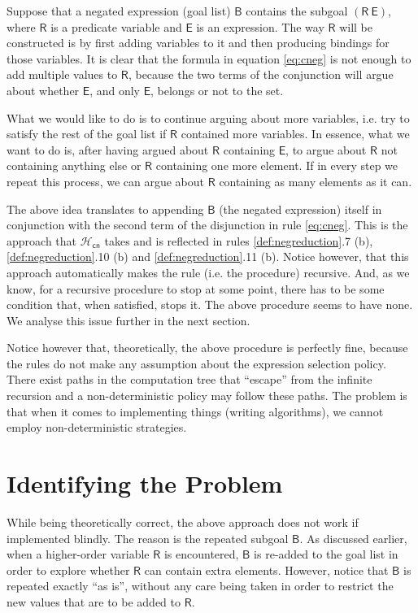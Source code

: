 \documentclass[inscr,ack,preface]{dithesis}
\theoremstyle{definition}
\newcommand{\hcn}{$\mathcal{H}_\mathsf{cn}$}
\newcommand{\msf}[1]{$\mathsf{#1}$}
\begin{document}
Suppose that a negated expression (goal list) \msf{B} contains the subgoal \msf{(R ~ E)}, where \msf{R} is a predicate variable and \msf{E} is an expression. The way \msf{R} will be constructed is by first adding variables to it and then producing bindings for those variables. It is clear that the formula in equation \ref{eq:cneg} is not enough to add multiple values to \msf{R}, because the two terms of the conjunction will argue about whether \msf{E}, and only \msf{E}, belongs or not to the set.

What we would like to do is to continue arguing about more variables, i.e. try to satisfy the rest of the goal list if \msf{R} contained more variables. In essence, what we want to do is, after having argued about \msf{R} containing \msf{E}, to argue about \msf{R} not containing anything else or \msf{R} containing one more element. If in every step we repeat this process, we can argue about \msf{R} containing as many elements as it can.

The above idea translates to appending \msf{B} (the negated expression) itself in conjunction with the second term of the disjunction in rule \ref{eq:cneg}. This is the approach that \hcn{} takes and is reflected in rules \ref{def:negreduction}.7 (b), \ref{def:negreduction}.10 (b) and \ref{def:negreduction}.11 (b). Notice however, that this approach automatically makes the rule (i.e. the procedure) recursive. And, as we know, for a recursive procedure to stop at some point, there has to be some condition that, when satisfied, stops it. The above procedure seems to have none. We analyse this issue further in the next section.

Notice however that, theoretically, the above procedure is perfectly fine, because the rules do not make any assumption about the expression selection policy. There exist paths in the computation tree that ``escape'' from the infinite recursion and a non-deterministic policy may follow these paths. The problem is that when it comes to implementing things (writing algorithms), we cannot employ non-deterministic strategies.

\section{Identifying the Problem}
While being theoretically correct, the above approach does not work if implemented blindly. The reason is the repeated subgoal \msf{B}. As discussed earlier, when a higher-order variable \msf{R} is encountered, \msf{B} is re-added to the goal list in order to explore whether \msf{R} can contain extra elements. However, notice that \msf{B} is repeated exactly ``as is'', without any care being taken in order to restrict the new values that are to be added to \msf{R}.
\end{document}
